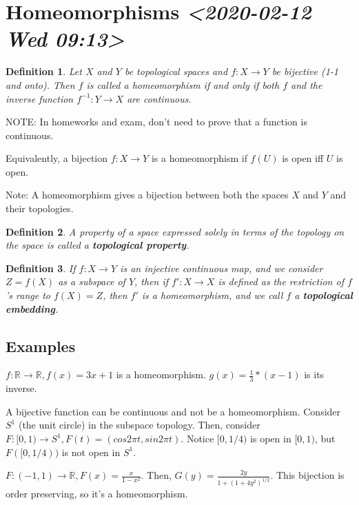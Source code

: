 \documentclass[11pt]{article}
\newtheorem{definition}{Definition}[section]
\begin{document}
\section{Homeomorphisms \textit{<2020-02-12 Wed 09:13>}}
\label{sec:org09f9925}

\begin{definition}
Let \(X\) and \(Y\) be topological spaces and \(f:X\rightarrow Y\) be
bijective (1-1 and onto). Then \(f\) is called a homeomorphism if and
only if both \(f\) and the inverse function \(f^{-1}:Y\rightarrow X\) are
continuous.
\end{definition}

NOTE: In homeworks and exam, don't need to prove that a function is
continuous. 

Equivalently, a bijection \(f:X\rightarrow Y\) is a homeomorphism if
\(f(U)\) is open iff \(U\) is open.

Note: A homeomorphism gives a bijection between both the spaces \(X\)
and \(Y\) and their topologies.

\begin{definition}
A property of a space expressed solely in terms of the topology
on the space is called a \textbf{topological property}.
\end{definition}

\begin{definition}
If \(f:X\rightarrow Y\) is an injective continuous map, and we consider
\(Z = f(X)\) as a subspace of \(Y\), then if \(f':X\rightarrow X\) is
defined as the restriction of \(f\)'s range to \(f(X) = Z\), then \(f'\) is
a homeomorphism, and we call \(f\) a \textbf{topological embedding}.
\end{definition}

\subsection{Examples}
\label{sec:org12fe265}

\(f:\mathbb{R}\rightarrow\mathbb{R}, f(x) = 3x + 1\) is a
homeomorphism. \(g(x) = \frac{1}{3}*(x - 1)\) is its inverse. 

A bijective function can be continuous and not be a
homeomorphism. Consider \(S^1\) (the unit circle) in the subspace
topology. Then, consider \(F: [0,1) \rightarrow S^1, F(t) = (cos 2\pi
t, sin 2 \pi t)\). Notice \([0, 1/4)\) is open in \([0,1)\), but
\(F([0,1/4))\) is not open in \(S^1\).

\(F:(-1, 1)\rightarrow \mathbb{R}, F(x) = \frac{x}{1 - x^2}\). Then,
\(G(y) = \frac{2y}{1 + (1 + 4y^2)^{1/2}}\). This bijection is order
preserving, so it's a homeomorphism. 
\end{document}
